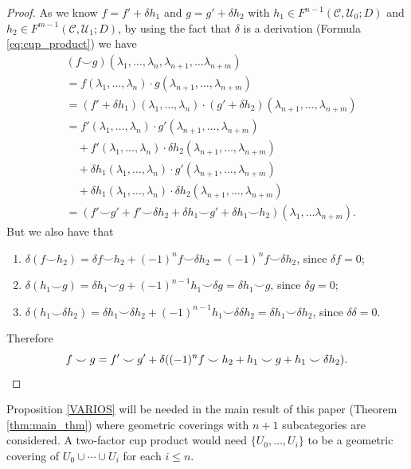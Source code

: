 \documentclass[12pt,reqno]{amsart}
\theoremstyle{definition}
\theoremstyle{remark}
\numberwithin{figure}{section}%
\newcommand{\CC}{\mathcal{C}}
\newcommand{\Uc}{\mathcal{U}}
\begin{document}
\begin{proof}
    As we know $f=f'+\delta h_1$ and $g=g'+\delta h_2$ with $h_1 \in F^{n-1}(\CC,\Uc_0;D)$ and $h_2 \in F^{m-1}(\CC,\Uc_1;D)$, by using the fact that $\delta$ is a derivation (Formula \eqref{eq:cup_product}) we have 
    \begin{align*}
         &(f \smile g)(\lambda_1,\ldots,\lambda_n, \lambda_{n+1}, \ldots \lambda_{n+m})\\
         &=f(\lambda_1,\ldots,\lambda_n) \cdot g(\lambda_{n+1},\ldots,\lambda_{n+m}) \\
         &=(f'+\delta h_1)(\lambda_1,\ldots,\lambda_n) \cdot (g'+\delta h_2)(\lambda_{n+1},\ldots,\lambda_{n+m}) \\
         &= f'(\lambda_1,\ldots,\lambda_n)\cdot g' (\lambda_{n+1},\ldots,\lambda_{n+m})\\ &\quad + f'(\lambda_1,\ldots,\lambda_n) \cdot \delta h_2 (\lambda_{n+1},\ldots,\lambda_{n+m}) \\ &\quad + \delta h_1(\lambda_1,\ldots,\lambda_n) \cdot g' (\lambda_{n+1},\ldots,\lambda_{n+m})\\
        & \quad+ \delta h_1 (\lambda_1,\ldots,\lambda_n) \cdot \delta h_2(\lambda_{n+1},\ldots,\lambda_{n+m}) \\
          &= (f' \smile g' + f' \smile \delta h_2 + \delta h_1 \smile g' + \delta h_1 \smile h_2) (\lambda_1,\ldots\lambda_{n+m}).
    \end{align*}
    But we also have that 
    \begin{enumerate}
        \item $\delta(f \smile h_2)=\delta f \smile h_2+(-1)^{n}f \smile \delta h_2=(-1)^{n}f \smile \delta h_2$, since $\delta f=0$;
        \item  $\delta(h_1 \smile g)=\delta h_1 \smile g+(-1)^{n-1} h_1 \smile \delta g= \delta h_1 \smile g$, since $\delta g=0$;
        \item $\delta(h_1 \smile \delta h_2)= \delta h_1 \smile \delta h_2 +(-1)^{n-1} h_1 \smile \delta  \delta h_2 =\delta h_1 \smile \delta h_2$, since $\delta \delta =0$.
    \end{enumerate}
    Therefore $$f \smile g= f'\smile g' +\delta((-1)^{n}f \smile h_2 + h_1 \smile g + h_1 \smile \delta h_2).\qedhere$$
\end{proof}

Proposition \ref{VARIOS} will be needed in the main result of this paper (Theorem \ref{thm:main_thm}) where geometric coverings with $n+1$ subcategories are considered. A two-factor cup product would need  $\{U_0,\dots, U_i\}$ to be a geometric covering of $U_0\cup \cdots\cup U_i$ for each $i\leq n$.
\end{document}
